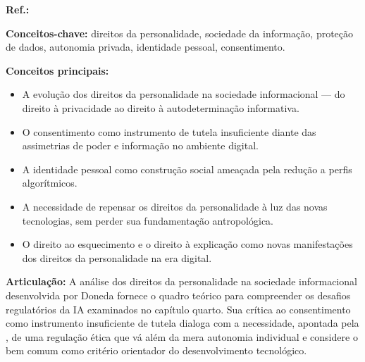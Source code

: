 \begin{fichamento}
    \textbf{Ref.:} \cite{Doneda2022DPD}
    
    \textbf{Conceitos-chave:} direitos da personalidade, sociedade da informação, proteção de dados, autonomia privada, identidade pessoal, consentimento.
    
    \textbf{Conceitos principais:}
    \begin{itemize}
        \item A evolução dos direitos da personalidade na sociedade informacional — do direito à privacidade ao direito à autodeterminação informativa.
        \item O consentimento como instrumento de tutela insuficiente diante das assimetrias de poder e informação no ambiente digital.
        \item A identidade pessoal como construção social ameaçada pela redução a perfis algorítmicos.
        \item A necessidade de repensar os direitos da personalidade à luz das novas tecnologias, sem perder sua fundamentação antropológica.
        \item O direito ao esquecimento e o direito à explicação como novas manifestações dos direitos da personalidade na era digital.
    \end{itemize}
    
    \textbf{Articulação:} A análise dos direitos da personalidade na sociedade informacional desenvolvida por Doneda fornece o quadro teórico para compreender os desafios regulatórios da IA examinados no capítulo quarto. Sua crítica ao consentimento como instrumento insuficiente de tutela dialoga com a necessidade, apontada pela \MH{}, de uma regulação ética que vá além da mera autonomia individual e considere o bem comum como critério orientador do desenvolvimento tecnológico.
\end{fichamento}

